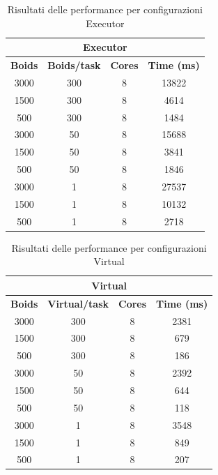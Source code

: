\documentclass[a4paper,12pt]{report}
\begin{document}
\begin{table}[h!]
    \centering
    \caption{Risultati delle performance per configurazioni Executor}
    \begin{tabular}{|c|c|c|c|}
    \hline
    \multicolumn{4}{|c|}{\textbf{Executor}} \\
    \hline
    \textbf{Boids} & \textbf{Boids/task} & \textbf{Cores} & \textbf{Time (ms)}\\
    \hline
    3000 & 300 & 8 & 13822 \\
    1500 & 300 & 8 & 4614 \\
    500  & 300 & 8 & 1484 \\
    \hline
    \hline
    3000 & 50  & 8 & 15688 \\
    1500 & 50  & 8 & 3841 \\
    500  & 50  & 8 & 1846 \\
    \hline
    \hline
    3000 & 1   & 8 & 27537 \\
    1500 & 1   & 8 & 10132 \\
    500  & 1   & 8 & 2718 \\
    \hline
    \end{tabular}
    \label{tab:executor-performance}
\end{table}

\begin{table}[h!]
    \centering
    \caption{Risultati delle performance per configurazioni Virtual}
    \begin{tabular}{|c|c|c|c|}
    \hline
    \multicolumn{4}{|c|}{\textbf{Virtual}} \\
    \hline
    \textbf{Boids} & \textbf{Virtual/task} & \textbf{Cores} & \textbf{Time (ms)}\\
    \hline
    3000 & 300 & 8  & 2381 \\
    1500 & 300 & 8  & 679  \\
    500  & 300 & 8  & 186  \\
    \hline
    \hline
    3000 & 50  & 8  & 2392 \\
    1500 & 50  & 8  & 644  \\
    500  & 50  & 8  & 118  \\
    \hline
    \hline
    3000 & 1   & 8  & 3548 \\
    1500 & 1   & 8  & 849  \\
    500  & 1   & 8  & 207  \\
    \hline
    \end{tabular}
    \label{tab:virtual-performance}
\end{table}
\end{document}
